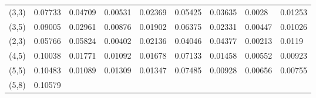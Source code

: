 \documentclass[10pt,twosided]{article}
\numberwithin{equation}{section}
\numberwithin{equation}{section}
\begin{document}
\begin{table}
\begin{tabular}{|p{41pt}|p{32pt}|p{38pt}|p{32pt}|p{38pt}|p{32pt}|p{38pt}|p{32pt}|p{38pt}|}
{} \\
\hline
\parbox{41pt}{\raggedright
(3,3)
} & \parbox{32pt}{\raggedright
0.07733
} & \parbox{38pt}{\raggedright
0.04709
} & \parbox{32pt}{\raggedright
0.00531
} & \parbox{38pt}{\raggedright
0.02369
} & \parbox{32pt}{\raggedright
0.05425
} & \parbox{38pt}{\raggedright
0.03635
} & \parbox{32pt}{\raggedright
0.0028
} & \parbox{38pt}{\raggedright
0.01253
} \\
\hline
\parbox{41pt}{\raggedright
(3,5)
} & \parbox{32pt}{\raggedright
0.09005
} & \parbox{38pt}{\raggedright
0.02961
} & \parbox{32pt}{\raggedright
0.00876
} & \parbox{38pt}{\raggedright
0.01902
} & \parbox{32pt}{\raggedright
0.06375
} & \parbox{38pt}{\raggedright
0.02331
} & \parbox{32pt}{\raggedright
0.00447
} & \parbox{38pt}{\raggedright
0.01026
} \\
\hline
\parbox{41pt}{\raggedright
(2,3)
} & \parbox{32pt}{\raggedright
0.05766
} & \parbox{38pt}{\raggedright
0.05824
} & \parbox{32pt}{\raggedright
0.00402
} & \parbox{38pt}{\raggedright
0.02136
} & \parbox{32pt}{\raggedright
0.04046
} & \parbox{38pt}{\raggedright
0.04377
} & \parbox{32pt}{\raggedright
0.00213
} & \parbox{38pt}{\raggedright
0.0119
} \\
\hline
\parbox{41pt}{\raggedright
(4,5)
} & \parbox{32pt}{\raggedright
0.10038
} & \parbox{38pt}{\raggedright
0.01771
} & \parbox{32pt}{\raggedright
0.01092
} & \parbox{38pt}{\raggedright
0.01678
} & \parbox{32pt}{\raggedright
0.07133
} & \parbox{38pt}{\raggedright
0.01458
} & \parbox{32pt}{\raggedright
0.00552
} & \parbox{38pt}{\raggedright
0.00923
} \\
\hline
\parbox{41pt}{\raggedright
(5,5)
} & \parbox{32pt}{\raggedright
0.10483
} & \parbox{38pt}{\raggedright
0.01089
} & \parbox{32pt}{\raggedright
0.01309
} & \parbox{38pt}{\raggedright
0.01347
} & \parbox{32pt}{\raggedright
0.07485
} & \parbox{38pt}{\raggedright
0.00928
} & \parbox{32pt}{\raggedright
0.00656
} & \parbox{38pt}{\raggedright
0.00755
} \\
\hline
\parbox{41pt}{\raggedright
(5,8)
} & \parbox{32pt}{\raggedright
0.10579

}
\end{tabular}
\end{table}
\end{document}
